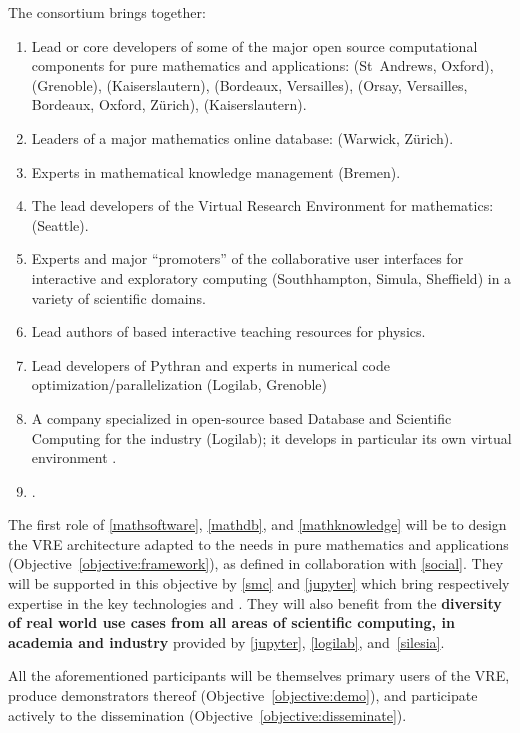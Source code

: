 \documentclass[noworkareas,deliverables,keys]{euproposal}                  %
\begin{document}
\begin{proposal}
The consortium brings together:
\begin{enumerate}
\item \label{mathsoftware} Lead or core developers of some of the
  major open source computational components for pure mathematics and
  applications: \GAP (St~Andrews, Oxford), \Linbox (Grenoble),
  \MPIR (Kaiserslautern), \Pari (Bordeaux, Versailles), \Sage (Orsay,
  Versailles, Bordeaux, Oxford, Zürich), \Singular (Kaiserslautern).
\item \label{mathdb} Leaders of a major mathematics online database:
  \LMFDB (Warwick, Zürich).
\item \label{mathknowledge} Experts in mathematical knowledge
  management (Bremen).
\item \label{smc} The lead developers of the Virtual Research
  Environment for mathematics: \SMC (Seattle).
\item \label{jupyter} Experts and major ``promoters'' of the \Jupyter
  collaborative user interfaces for interactive and exploratory
  computing (Southhampton, Simula, Sheffield) in a variety of
  scientific domains.
\item \label{silesia} Lead authors of \Jupyter based interactive
  teaching resources for physics.
\item \label{pythran} Lead developers of Pythran and experts in
  numerical code optimization/parallelization (Logilab, Grenoble)
\item \label{logilab} A company specialized in open-source based
  Database and Scientific Computing for the industry (Logilab); it
  develops in particular its own virtual environment \Simulagora.
\item \label{social} .
\end{enumerate}

The first role of \ref{mathsoftware}, \ref{mathdb}, and
\ref{mathknowledge} will be to design the \TheProject VRE architecture
adapted to the needs in pure mathematics and applications
(Objective~\ref{objective:framework}), as defined in collaboration
with \ref{social}. They will be supported in this objective by
\ref{smc} and \ref{jupyter} which bring respectively expertise in the
key technologies \SMC and \Jupyter. They will also benefit from the
\textbf{diversity of real world use cases from all areas of scientific
  computing, in academia and industry} provided by \ref{jupyter},
\ref{logilab}, and~\ref{silesia}.

All the aforementioned participants will be themselves primary users
of the \TheProject VRE, produce demonstrators thereof
(Objective~\ref{objective:demo}), and participate actively to the dissemination
(Objective~\ref{objective:disseminate}).


\end{proposal}
\end{document}

